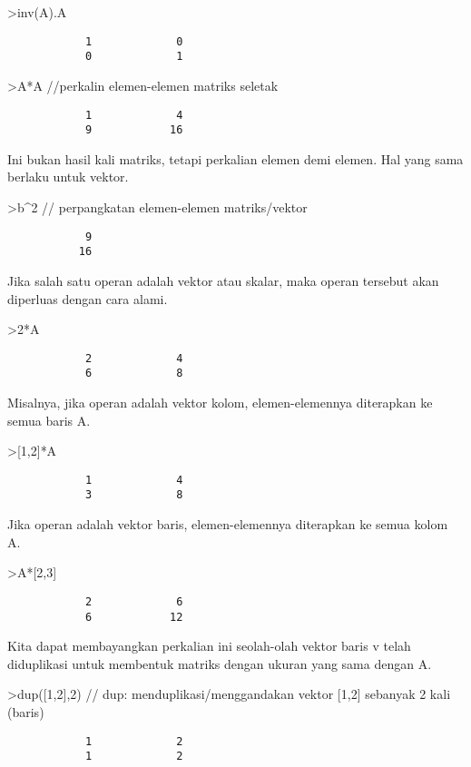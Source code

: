 \documentclass[
]{book}
\begin{document}
\textgreater inv(A).A

\begin{verbatim}
            1             0 
            0             1 
\end{verbatim}

\textgreater A*A //perkalin elemen-elemen matriks seletak

\begin{verbatim}
            1             4 
            9            16 
\end{verbatim}

Ini bukan hasil kali matriks, tetapi perkalian elemen demi elemen. Hal yang sama berlaku untuk vektor.

\textgreater b\^{}2 // perpangkatan elemen-elemen matriks/vektor

\begin{verbatim}
            9 
           16 
\end{verbatim}

Jika salah satu operan adalah vektor atau skalar, maka operan tersebut akan diperluas dengan cara alami.

\textgreater2*A

\begin{verbatim}
            2             4 
            6             8 
\end{verbatim}

Misalnya, jika operan adalah vektor kolom, elemen-elemennya diterapkan ke semua baris A.

\textgreater{[}1,2{]}*A

\begin{verbatim}
            1             4 
            3             8 
\end{verbatim}

Jika operan adalah vektor baris, elemen-elemennya diterapkan ke semua kolom A.

\textgreater A*{[}2,3{]}

\begin{verbatim}
            2             6 
            6            12 
\end{verbatim}

Kita dapat membayangkan perkalian ini seolah-olah vektor baris v telah diduplikasi untuk membentuk matriks dengan ukuran yang sama dengan A.

\textgreater dup({[}1,2{]},2) // dup: menduplikasi/menggandakan vektor {[}1,2{]} sebanyak 2 kali (baris)

\begin{verbatim}
            1             2 
            1             2 
\end{verbatim}
\end{document}
